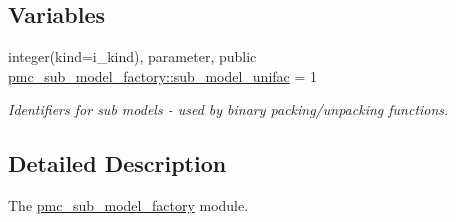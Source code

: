 \subsection*{Variables}
\begin{DoxyCompactItemize}
\item 
integer(kind=i\+\_\+kind), parameter, public \mbox{\hyperlink{namespacepmc__sub__model__factory_ad127121ccbf7246c2d39c3d94349b116}{pmc\+\_\+sub\+\_\+model\+\_\+factory\+::sub\+\_\+model\+\_\+unifac}} = 1
\begin{DoxyCompactList}\small\item\em Identifiers for sub models -\/ used by binary packing/unpacking functions. \end{DoxyCompactList}\end{DoxyCompactItemize}


\subsection{Detailed Description}
The \mbox{\hyperlink{namespacepmc__sub__model__factory}{pmc\+\_\+sub\+\_\+model\+\_\+factory}} module. 

